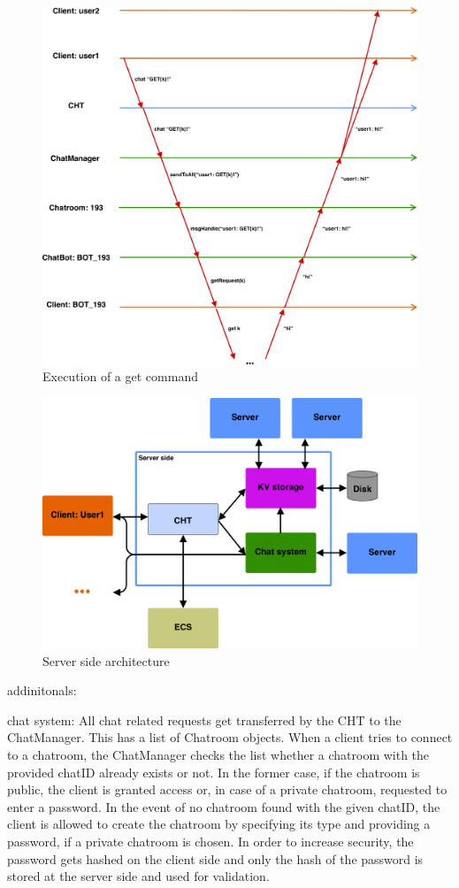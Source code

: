 \begin{figure}[h]
	\centering
	\includegraphics[width=\linewidth]{figures/chat/chat_graph.png}
	\caption{Execution of a get command}
\end{figure}


\begin{figure}[h]
	\centering
	\includegraphics[width=\linewidth]{figures/chat/chat_full_arch.png}
	\caption{Server side architecture}
\end{figure}

addinitonals:

chat system:
All chat related requests get transferred by the CHT to the ChatManager. This has a list of Chatroom objects. When a client tries to connect to a chatroom, the ChatManager checks the list whether a chatroom with the provided chatID already exists or not. In the former case, 
if the chatroom is public, the client is granted access or, in case of a private chatroom, requested to enter a password. In the event of no chatroom found with the given chatID, the client is allowed to create the chatroom by specifying its type and providing a password, if a private chatroom is chosen. In order to increase security, the password gets hashed on the client side and only the hash of the password is stored at the server side and used for validation.



